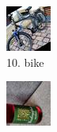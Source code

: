 \documentclass{tubaf-article}
\begin{document}
	\begin{figure}[h!]
		\centering
		\begin{subfigure}[b]{0.3\textwidth}
			\centering
			\includegraphics[width=\textwidth]{413_0.jpeg}
			\caption{10. bike}
			\label{fig:bild1}
		\end{subfigure}
		\hfill
		\begin{subfigure}[b]{0.3\textwidth}
			\centering
			\includegraphics[width=\textwidth]{827_3.jpeg}

\end{subfigure}
\end{figure}
\end{document}
